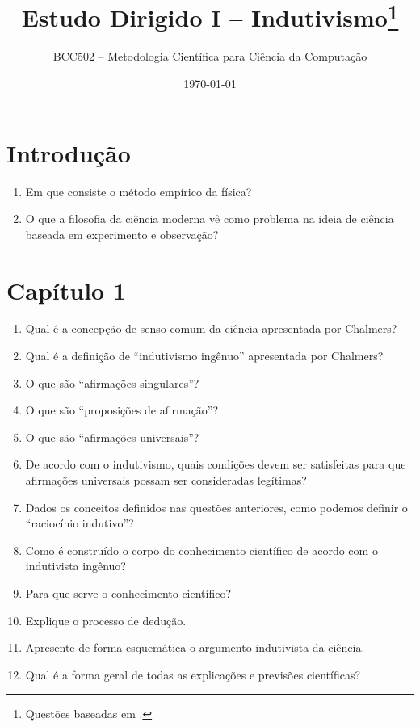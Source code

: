 \documentclass[10pt,a4paper]{extarticle}
\title{Estudo Dirigido I -- Indutivismo\footnote{Questões baseadas em \citep{chalmers1993}.}}
\author{BCC502 -- Metodologia Científica para Ciência da Computação}
\date{\today}
\begin{document}
\maketitle

\section*{Introdução}
\begin{enumerate}[label=\textbf{\arabic*.}, itemsep=6pt]
  \item Em que consiste o método empírico da física?
  \item O que a filosofia da ciência moderna vê como problema na ideia de ciência baseada em experimento e observação?
\end{enumerate}

\section*{Capítulo 1}
\begin{enumerate}[resume, label=\textbf{\arabic*.}, itemsep=6pt]
  \item Qual é a concepção de senso comum da ciência apresentada por Chalmers?
  \item Qual é a definição de \enquote{indutivismo ingênuo} apresentada por Chalmers?
  \item O que são \enquote{afirmações singulares}?
  \item O que são \enquote{proposições de afirmação}?
  \item O que são \enquote{afirmações universais}?
  \item De acordo com o indutivismo, quais condições devem ser satisfeitas para que afirmações universais possam ser consideradas legítimas?
  \item Dados os conceitos definidos nas questões anteriores, como podemos definir o \enquote{raciocínio indutivo}?
  \item Como é construído o corpo do conhecimento científico de acordo com o indutivista ingênuo?
  \item Para que serve o conhecimento científico?
  \item Explique o processo de dedução.
  \item Apresente de forma esquemática o argumento indutivista da ciência.
  \item Qual é a forma geral de todas as explicações e previsões científicas?
\end{enumerate}
\end{document}
